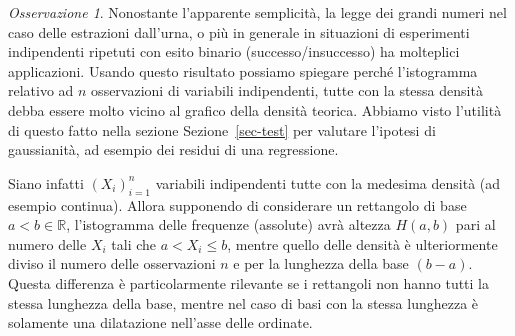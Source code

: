 \documentclass[
  italian,
  letterpaper,
]{book}
\newenvironment{Shaded}{\begin{snugshade}}{\end{snugshade}}
\newcommand{\AttributeTok}[1]{\textcolor[rgb]{0.40,0.45,0.13}{#1}}
\newcommand{\CommentTok}[1]{\textcolor[rgb]{0.37,0.37,0.37}{#1}}
\newcommand{\ConstantTok}[1]{\textcolor[rgb]{0.56,0.35,0.01}{#1}}
\newcommand{\DecValTok}[1]{\textcolor[rgb]{0.68,0.00,0.00}{#1}}
\newcommand{\FunctionTok}[1]{\textcolor[rgb]{0.28,0.35,0.67}{#1}}
\newcommand{\NormalTok}[1]{\textcolor[rgb]{0.00,0.23,0.31}{#1}}
\newcommand{\SpecialCharTok}[1]{\textcolor[rgb]{0.37,0.37,0.37}{#1}}
\newcommand{\StringTok}[1]{\textcolor[rgb]{0.13,0.47,0.30}{#1}}
\newcommand{\R}{\mathbb{R}}
\theoremstyle{definition}
\theoremstyle{remark}
\newtheorem*{remark}{Osservazione}
\begin{document}
\begin{remark}
Nonostante l'apparente semplicità, la legge dei grandi numeri nel caso
delle estrazioni dall'urna, o più in generale in situazioni di
esperimenti indipendenti ripetuti con esito binario
(successo/insuccesso) ha molteplici applicazioni. Usando questo
risultato possiamo spiegare perché l'istogramma relativo ad \(n\)
osservazioni di variabili indipendenti, tutte con la stessa densità
debba essere molto vicino al grafico della densità teorica. Abbiamo
visto l'utilità di questo fatto nella sezione Sezione~\ref{sec-test} per
valutare l'ipotesi di gaussianità, ad esempio dei residui di una
regressione.

Siano infatti \((X_i)_{i=1}^n\) variabili indipendenti tutte con la
medesima densità (ad esempio continua). Allora supponendo di considerare
un rettangolo di base \(a<b \in \R\), l'istogramma delle frequenze
(assolute) avrà altezza \(H(a,b)\) pari al numero delle \(X_i\) tali che
\(a<X_i \le b\), mentre quello delle densità è ulteriormente diviso il
numero delle osservazioni \(n\) e per la lunghezza della base \((b-a)\).
Questa differenza è particolarmente rilevante se i rettangoli non hanno
tutti la stessa lunghezza della base, mentre nel caso di basi con la
stessa lunghezza è solamente una dilatazione nell'asse delle ordinate.

\begin{Shaded}
\end{Shaded}


\end{remark}
\end{document}
